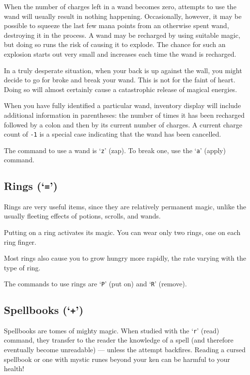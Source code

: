 When the number of charges left in a wand becomes zero, attempts to use the
wand will usually result in nothing happening.  Occasionally, however, it may
be possible to squeeze the last few mana points from an otherwise spent wand,
destroying it in the process.  A wand may be recharged by using suitable
magic, but doing so runs the risk of causing it to explode.  The chance
for such an explosion starts out very small and increases each time the
wand is recharged.

In a truly desperate situation, when your back is up against the wall, you
might decide to go for broke and break your wand.  This is not for the faint
of heart.  Doing so will almost certainly cause a catastrophic release of
magical energies.

When you have fully identified a particular wand, inventory display will
include additional information in parentheses: the number of times it has
been recharged followed by a colon and then by its current number of charges.
A current charge count of {\tt -1} is a special case indicating that the wand
has been cancelled.

The command to use a wand is `{\tt z}' (zap).  To break one, use the `{\tt a}'
(apply) command.

\subsection*{Rings (`{\tt =}')}

Rings are very useful items, since they are relatively permanent
magic, unlike the usually fleeting effects of potions, scrolls, and
wands.

Putting on a ring activates its magic.  You can wear only two
rings, one on each ring finger.

Most rings also cause you to grow hungry more rapidly, the rate
varying with the type of ring.

The commands to use rings are `{\tt P}' (put on) and `{\tt R}' (remove).

\subsection*{Spellbooks (`{\tt +}')}

Spellbooks are tomes of mighty magic.  When studied with the `{\tt r}' (read)
command, they transfer to the reader the knowledge of a spell (and
therefore eventually become unreadable) --- unless the attempt backfires.
Reading a cursed spellbook or one with mystic runes beyond
your ken can be harmful to your health!

